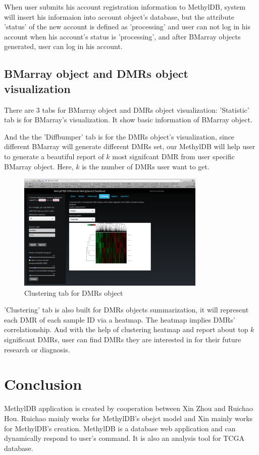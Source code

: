 \documentclass{article}\usepackage[]{graphicx}\usepackage[]{color}
\begin{document}
When user submits his account registration information to MethylDB, system will insert his informaion into account object's database, but the attribute 'status' of the new account is defined as 'processing' and user can not log in his account when his account's status is 'processing', and after BMarray objects generated, user can log in his account. 

\subsection{BMarray object and DMRs object visualization}
There are 3 tabs for BMarray object and DMRs object visualization: 'Statistic' tab is for BMarray's visualization. It show basic information of BMarray object. 

And the the 'Diffbumper' tab is for the DMRs object's visualization, since different BMarray will generate different DMRs set, our MethylDB will help user to generate a beautiful report of $k$ most signifcant DMR from user specific BMarray object. Here, $k$ is the number of DMRs user want to get. 

\begin{figure}
\centering
\includegraphics[width=0.8\textwidth]{Clusterng.png}
\caption{Clustering tab for DMRs object}
\end{figure}

'Clustering' tab is also built for DMRs objects summarization, it will represent each DMR of each sample ID via a heatmap. The heatmap implies DMRs' correlationship. And with the help of clustering heatmap and report about top $k$ significant DMRs, user can find DMRs they are interested in for their future research or diagnosis.


\section{Conclusion}
MethylDB application is created by cooperation between Xin Zhou and Ruichao Hou. Ruichao mainly works for MethylDB's obejct model and Xin mainly works for MethylDB's creation. MethylDB is a database web application and can dynamically respond to user's command. It is also an analysis tool for TCGA database. 
\end{document}
